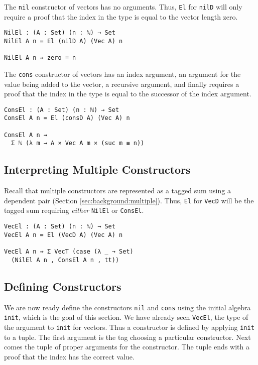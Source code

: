 \documentclass[preprint,nonatbib]{sigplanconf}
\newcommand{\refsec}[1]{Section \ref{sec:#1}}
\begin{document}
The {\tt nil} constructor of vectors has no arguments. Thus,
{\tt El} for {\tt nilD} will only require a proof that the index in
the type is equal to the vector length zero.

\begin{verbatim}
NilEl : (A : Set) (n : ℕ) → Set
NilEl A n = El (nilD A) (Vec A) n

NilEl A n ⇝ zero ≡ n
\end{verbatim}

The {\tt cons} constructor of vectors has an index argument, an
argument for the value being added to the vector, a recursive
argument, and finally requires a proof that the index in the type is
equal to the successor of the index argument.

\begin{verbatim}
ConsEl : (A : Set) (n : ℕ) → Set
ConsEl A n = El (consD A) (Vec A) n

ConsEl A n ⇝
  Σ ℕ (λ m → A × Vec A m × (suc m ≡ n))
\end{verbatim}

\subsection{Interpreting Multiple Constructors}

Recall that multiple constructors are represented as a tagged sum
using a dependent pair (\refsec{background:multiple}). Thus,
{\tt El} for {\tt VecD} will be the tagged sum requiring
{\it either} {\tt NilEl} or {\tt ConsEl}.

\begin{verbatim}
VecEl : (A : Set) (n : ℕ) → Set
VecEl A n = El (VecD A) (Vec A) n

VecEl A n ⇝ Σ VecT (case (λ _ → Set)
  (NilEl A n , ConsEl A n , tt))
\end{verbatim}

\subsection{Defining Constructors}
\label{sec:init:cons}

We are now ready define the constructors {\tt nil} and
{\tt cons} using the initial algebra {\tt init}, which is the goal of
this section.
We have already seen
{\tt VecEl}, the type of the argument to {\tt init} for vectors.
Thus a constructor is defined by applying {\tt init} to a tuple. The
first argument is the tag choosing a particular constructor. Next comes
the tuple of proper arguments for the constructor. The tuple
ends with a proof that the index has the correct value.
\end{document}
